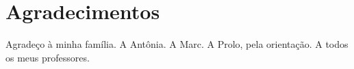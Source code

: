 
\chapter*{Agradecimentos}

Agradeço à minha família. A Antônia. A Marc. A Prolo, pela orientação. A todos os meus professores.
